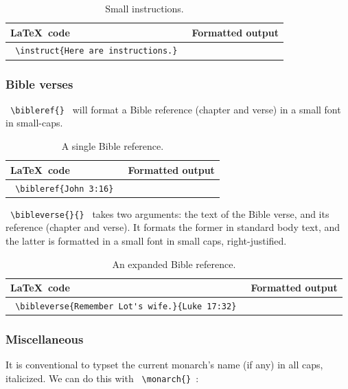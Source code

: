 \documentclass{article}
\begin{document}
\begin{table}[h!]
	\centering
	\begin{tabular}{l l} 
	\toprule
	\LaTeX\ code & Formatted output \\
	\midrule
	\lstinline! \instruct{Here are instructions.} ! & \sabon{\instructsmall{Here are instructions.}} \\
	\bottomrule
	\end{tabular}
	\caption{Small instructions.}
\end{table}

\subsubsection{Bible verses}

\lstinline! \bibleref{} ! will format a Bible reference (chapter and verse) in a small font in small-caps.

\begin{table}[h!]
	\centering
	\begin{tabular}{l l} 
	\toprule
	\LaTeX\ code & Formatted output \\
	\midrule
	\lstinline! \bibleref{John 3:16} ! & \sabon{\bibleref{John 3:16}} \\
	\bottomrule
	\end{tabular}
	\caption{A single Bible reference.}
\end{table}

\lstinline! \bibleverse{}{} ! takes two arguments: the text of the Bible verse, and its reference (chapter and verse). It formats the former in standard body text, and the latter is formatted in a small font in small caps, right-justified.

\begin{table}[h!]
	\centering
	\begin{tabular}{l l} 
	\toprule
	\LaTeX\ code & Formatted output \\
	\midrule
	\lstinline! \bibleverse{Remember Lot's wife.}{Luke 17:32} ! & \sabon{Remember Lot's wife. \scriptsize\textsc{Luke 17:32} } \\
	\bottomrule
	\end{tabular}
	\caption{An expanded Bible reference.}
\end{table}

\subsubsection{Miscellaneous}

It is conventional to typset the current monarch’s name (if any) in all caps, italicized. We can do this with \lstinline! \monarch{} !:
\end{document}
